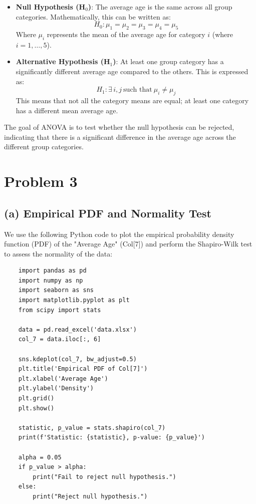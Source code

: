\documentclass[12pt]{article}
\begin{document}
\begin{itemize}
    \item \textbf{Null Hypothesis (H$_0$)}: The average age is the same across all group categories. Mathematically, this can be written as:
    \[
    H_0: \mu_1 = \mu_2 = \mu_3 = \mu_4 = \mu_5
    \]
    Where $\mu_i$ represents the mean of the average age for category $i$ (where $i = 1, \dots, 5$).
    
    \item \textbf{Alternative Hypothesis (H$_1$)}: At least one group category has a significantly different average age compared to the others. This is expressed as:
    \[
    H_1: \exists \, i, j \ \text{such that} \ \mu_i \neq \mu_j
    \]
    This means that not all the category means are equal; at least one category has a different mean average age.
\end{itemize}

The goal of ANOVA is to test whether the null hypothesis can be rejected, indicating that there is a significant difference in the average age across the different group categories.


\section*{Problem 3}

\subsection*{(a) Empirical PDF and Normality Test}

We use the following Python code to plot the empirical probability density function (PDF) of the "Average Age" (Col[7]) and perform the Shapiro-Wilk test to assess the normality of the data:

\begin{verbatim}
    import pandas as pd
    import numpy as np
    import seaborn as sns
    import matplotlib.pyplot as plt
    from scipy import stats

    data = pd.read_excel('data.xlsx')
    col_7 = data.iloc[:, 6]  

    sns.kdeplot(col_7, bw_adjust=0.5)
    plt.title('Empirical PDF of Col[7]')
    plt.xlabel('Average Age')
    plt.ylabel('Density')
    plt.grid()
    plt.show()

    statistic, p_value = stats.shapiro(col_7) 
    print(f'Statistic: {statistic}, p-value: {p_value}')

    alpha = 0.05
    if p_value > alpha:
        print("Fail to reject null hypothesis.")
    else:
        print("Reject null hypothesis.")

\end{verbatim}
\end{document}
